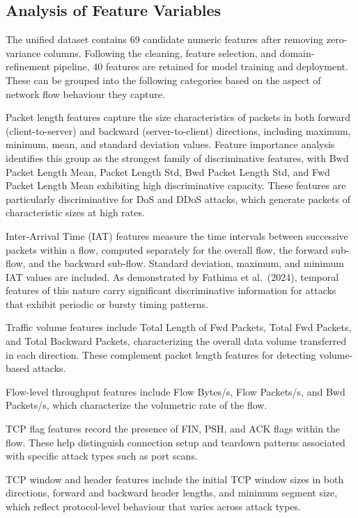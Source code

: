 \documentclass[12pt,a4paper]{report}
\begin{document}
\subsection{Analysis of Feature Variables}

The unified dataset contains 69 candidate numeric features after removing zero-variance columns. Following the cleaning, feature selection, and domain-refinement pipeline, 40 features are retained for model training and deployment. These can be grouped into the following categories based on the aspect of network flow behaviour they capture.

Packet length features capture the size characteristics of packets in both forward (client-to-server) and backward (server-to-client) directions, including maximum, minimum, mean, and standard deviation values. Feature importance analysis identifies this group as the strongest family of discriminative features, with Bwd Packet Length Mean, Packet Length Std, Bwd Packet Length Std, and Fwd Packet Length Mean exhibiting high discriminative capacity. These features are particularly discriminative for DoS and DDoS attacks, which generate packets of characteristic sizes at high rates.

Inter-Arrival Time (IAT) features measure the time intervals between successive packets within a flow, computed separately for the overall flow, the forward sub-flow, and the backward sub-flow. Standard deviation, maximum, and minimum IAT values are included. As demonstrated by Fathima et al.\ (2024), temporal features of this nature carry significant discriminative information for attacks that exhibit periodic or bursty timing patterns.

Traffic volume features include Total Length of Fwd Packets, Total Fwd Packets, and Total Backward Packets, characterizing the overall data volume transferred in each direction. These complement packet length features for detecting volume-based attacks.

Flow-level throughput features include Flow Bytes/s, Flow Packets/s, and Bwd Packets/s, which characterize the volumetric rate of the flow.

TCP flag features record the presence of FIN, PSH, and ACK flags within the flow. These help distinguish connection setup and teardown patterns associated with specific attack types such as port scans.

TCP window and header features include the initial TCP window sizes in both directions, forward and backward header lengths, and minimum segment size, which reflect protocol-level behaviour that varies across attack types.
\end{document}
